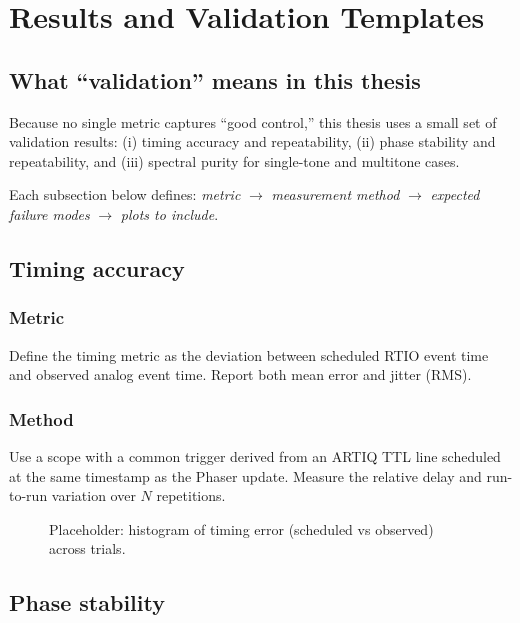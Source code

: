 \chapter{Results and Validation Templates}
\label{ch:results_validation}

\section{What ``validation'' means in this thesis}
Because no single metric captures ``good control,'' this thesis uses a small set of validation results:
(i) timing accuracy and repeatability, (ii) phase stability and repeatability, and (iii) spectral purity for single-tone
and multitone cases.

Each subsection below defines:
\emph{metric} $\rightarrow$ \emph{measurement method} $\rightarrow$ \emph{expected failure modes} $\rightarrow$ \emph{plots to include}.

\section{Timing accuracy}
\subsection{Metric}
Define the timing metric as the deviation between scheduled RTIO event time and observed analog event time.
Report both mean error and jitter (RMS).

\subsection{Method}
Use a scope with a common trigger derived from an ARTIQ TTL line scheduled at the same timestamp as the
Phaser update. Measure the relative delay and run-to-run variation over $N$ repetitions.

\begin{figure}[t]
  \centering
  \caption{Placeholder: histogram of timing error (scheduled vs observed) across trials.}
  \label{fig:result_timing_hist}
\end{figure}

\section{Phase stability}
